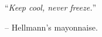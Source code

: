 \chapter*{}
\vspace*{0.2\textheight}
\begin{center}
\noindent\enquote{\itshape Keep cool, never freeze.}\hspace{1.5cm} \bigbreak

\hspace{1.5cm} -- Hellmann's\textsuperscript{\textregistered} mayonnaise.
\end{center}
